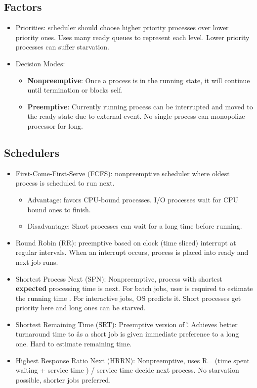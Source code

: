 \documentclass[fontsize=5pt]{scrartcl}
\begin{document}
\begin{multicols}{3}
      \subsection{Factors}
        \begin{itemize}
        \item Priorities: scheduler should choose higher priority processes over lower priority ones. Uses many ready queues to represent each level. Lower priority processes can suffer starvation.
        \item Decision Modes:
          \begin{itemize}
            \item \textbf{Nonpreemptive}: Once a process is in the running state, it will continue until termination or blocks self.
            \item \textbf{Preemptive}: Currently running process can be interrupted and moved to the ready state due to external event. No single process can monopolize processor for long.
          \end{itemize}
        \end{itemize}
      \subsection{Schedulers}
        \begin{itemize}
         \item First-Come-First-Serve (FCFS): nonpreemptive scheduler where oldest process is scheduled to run next.
         \begin{itemize}
           \item Advantage: favors CPU-bound processes. I/O processes wait for CPU bound ones to finish.
           \item Disadvantage: Short processes can wait for a long time before running.
         \end{itemize}
         \item Round Robin (RR): preemptive based on clock (time sliced) interrupt at regular intervals. When an interrupt occurs, process is placed into ready and next job runs.
         \item Shortest Process Next (SPN): Nonpreemptive, process with shortest \textbf{expected} processing time is next. For batch jobs, user is required to estimate the running time
               . For interactive jobs, OS predicts it. Short processes get priority here and long ones can be starved.
         \item Shortest Remaining Time (SRT): Preemptive version of \^. Achieves better turnaround time to \^ as a short job is given immediate preference to a long one. Hard to estimate remaining time.
         \item Highest Response Ratio Next (HRRN): Nonpreemptive, uses R= (time spent waiting + service time ) / service time decide next process. No starvation possible, shorter jobs preferred.
        \end{itemize}

\end{multicols}
\end{document}
